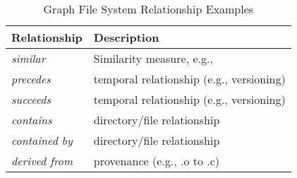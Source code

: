 \begin{table}[h]
    \begin{tabular}{p{1.9cm}p{5.5cm}}
        Relationship                           & Description\tabularnewline
        \hline
        \multirow{1}{*}{\textit{similar}}      &
        \multirow{1}{*}{\parbox{5.4cm}{Similarity measure, e.g., \cite{masci2014multimodal}}}
        \tabularnewline
        \multirow{1}{*}{\textit{precedes}}     &
        \multirow{1}{*}{\parbox{5.4cm}{temporal relationship (e.g., versioning)}}
        \tabularnewline
        \multirow{1}{*}{\textit{succeeds}}     &
        \multirow{1}{*}{\parbox{5.4cm}{temporal relationship (e.g., versioning)}}
        \tabularnewline
        \multirow{1}{*}{\textit{contains}}     &
        \multirow{1}{*}{\parbox{5.4cm}{directory/file relationship}}
        \tabularnewline
        \multirow{1}{*}{\textit{contained by}} &
        \multirow{1}{*}{\parbox{5.4cm}{directory/file relationship}}
        \tabularnewline
        \multirow{1}{*}{\textit{derived from}} &
        \multirow{1}{*}{\parbox{5.4cm}{provenance (e.g., .o to .c)}}
        \tabularnewline
    \end{tabular}
    \caption{Graph File System Relationship Examples}\label{hotos19:table:relationship-examples}
\end{table}

